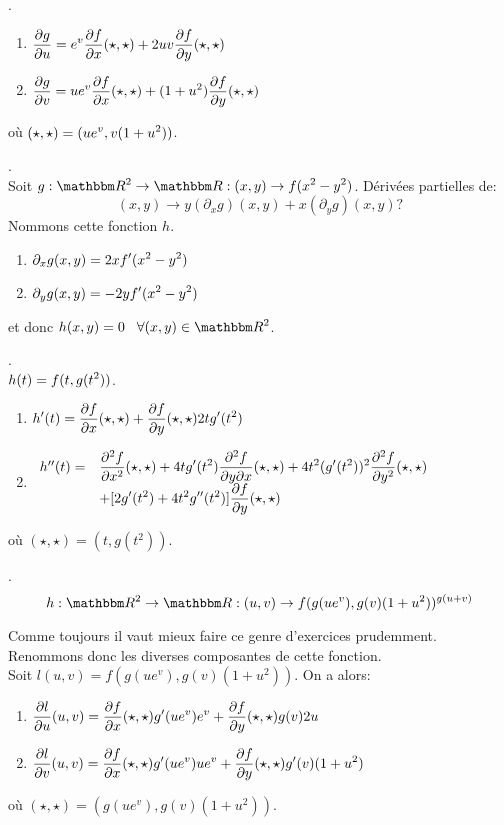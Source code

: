 .
\begin{enumerate}
\item $\dst{\dgdu = e^v\dfdx(\star,\star)+2uv\dfdy(\star,\star)}$
\item $\dst{\dgdv = ue^v\dfdx(\star,\star)+(1+u^2)\dfdy(\star,\star)}$
\end{enumerate}
où $\dst{(\star,\star) = (ue^v,v(1+u^2))}$.

\vspace{1cm}

. \\

\noindent Soit $\dst{g:\eR^2\rightarrow \eR:(x,y)\rightarrow  f(x^2-y^2)}$. Dérivées partielles de:\[(x,y)\rightarrow  y(\partial_xg)(x,y)+x(\partial_yg)(x,y)?\]
Nommons cette fonction $h$. 
\begin{enumerate}
\item $\dst{\partial_xg(x,y) = 2xf'(x^2-y^2)}$
\item$\dst{\partial_yg(x,y) = -2yf'(x^2-y^2)}$
\end{enumerate}
et donc $\dst{h(x,y) = 0 \hs \forall (x,y)\in \eR^2}$.

\vspace{1cm}


. \\

\noindent $\dst{h(t)=f(t,g(t^2))}$.\\

\begin{enumerate}
\item $\dst{h'(t)=\dfdx(\star,\star)+\dfdy(\star,\star)2tg'(t^2)}$
\item $ \ba{rl} h''(t)=     &  \dst{ \ddfdx(\star,\star)+4tg'(t^2)\ddfdxy(\star,\star)+4t^2(g'(t^2))^2\ddfdy(\star,\star) }\\     		
				    & \dst{+[2g'(t^2)+4t^2g''(t^2)]\dfdy(\star,\star)}\ea$

\end{enumerate}
où $(\star,\star) = (t,g(t^2))$.

\vspace{1cm}

.
\[h:\eR^2\rightarrow \eR:(u,v)\rightarrow  f(g(ue^v),g(v)(1+u^2))^{g(u+v)}\]

\noindent Comme toujours il vaut mieux faire ce genre d'exercices prudemment. Renommons donc les diverses composantes de cette fonction.\\

\noindent Soit $l(u,v)=f(g(ue^v),g(v)(1+u^2))$. On a alors:
\begin{enumerate}
\item $\dst{\dldu(u,v) = \dfdx(\star,\star)g'(ue^v)e^v + \dfdy(\star,\star)g(v)2u}$
\item $\dst{\dldv(u,v) = \dfdx(\star,\star)g'(ue^v)ue^v+\dfdy(\star,\star)g'(v)(1+u^2)}$
\end{enumerate}
o\`{u} $(\star,\star)=(g(ue^v),g(v)(1+u^2))$.\\

